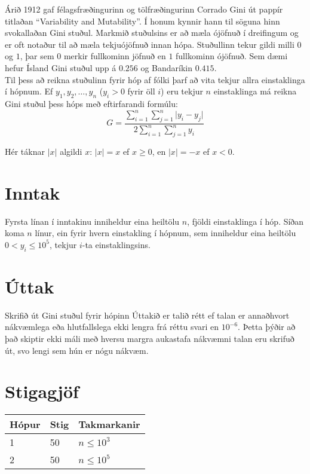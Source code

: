 %
Árið 1912 gaf félagsfræðingurinn og tölfræðingurinn Corrado Gini út pappír titlaðan ``Variability and Mutability''. 
Í honum kynnir hann til söguna hinn svokallaðan Gini stuðul. Markmið stuðulsins er að mæla ójöfnuð í dreifingum og
er oft notaður til að mæla tekjuójöfnuð innan hópa. Stuðullinn tekur gildi milli $0$ og $1$, þar sem $0$ merkir
fullkominn jöfnuð en $1$ fullkominn ójöfnuð. Sem dæmi hefur Ísland Gini stuðul upp á $0.256$ og Bandaríkin
$0.415$.
\\[0.5cm]
Til þess að reikna stuðulinn fyrir hóp af fólki þarf að vita tekjur allra einstaklinga í hópnum.
Ef $y_1, y_2, \ldots, y_n$ ($y_i > 0$ fyrir öll $i$) eru tekjur $n$ einstaklinga má reikna Gini stuðul þess hóps
með eftirfarandi formúlu:
\[
    G
    =
    \dfrac{
        \sum\limits_{i=1}^n \sum\limits_{j=1}^n \lvert y_i - y_j \rvert
    }{
        2 \sum\limits_{i=1}^n \sum\limits_{j=1}^n y_i
    }
\]

Hér táknar $\lvert x\rvert$ algildi $x$: $\lvert x\rvert = x$ ef $x \geq 0$, en $\lvert x\rvert = -x$ ef $x < 0$.

\section*{Inntak}
Fyrsta línan í inntakinu inniheldur eina heiltölu $n$, fjöldi einstaklinga í hóp.
Síðan koma $n$ línur, ein fyrir hvern einstakling í hópnum, sem inniheldur eina heiltölu $0 < y_i \leq 10^5$,
tekjur $i$-ta einstaklingsins.

\section*{Úttak}
Skrifið út Gini stuðul fyrir hópinn
Úttakið er talið rétt ef talan er annaðhvort nákvæmlega eða hlutfallslega ekki 
lengra frá réttu svari en $10^{-6}$. Þetta þýðir að það skiptir ekki máli með hversu 
margra aukastafa nákvæmni talan eru skrifuð út, svo lengi sem hún er nógu nákvæm.

\section*{Stigagjöf}
\begin{tabular}{|l|l|l|}
\hline
Hópur & Stig & Takmarkanir \\ \hline
1     & 50   & $n \leq 10^3$ \\ \hline
2     & 50   & $n \leq 10^5$ \\ \hline
\end{tabular}

